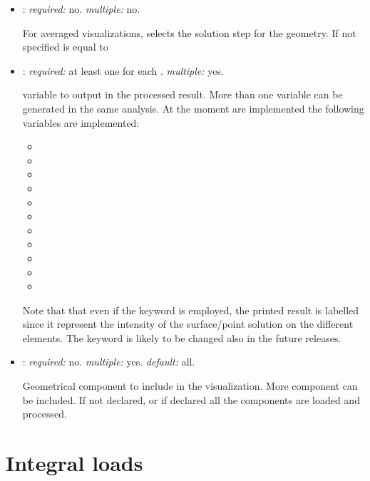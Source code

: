 \begin{itemize}
average the results in the given time span, and output just one averaged result. 
When used in visualizations,  must be False.

\item {}: \textit{required:} no. \textit{multiple:} no.

For averaged visualizations, selects the solution step for the geometry.
If not specified is equal to 

\item {}: \textit{required:} at least one for each . 
\textit{multiple:} yes.

variable to output in the processed result. More than one variable can be generated 
in the same analysis. At the moment are implemented the following variables are implemented: 
\begin{itemize}
  \item {}
  \item {}
  \item {}
  \item {}
  \item {}
  \item {}
  \item {}
  \item {}
  \item {}
  \item {}
  \item {}
\end{itemize} 
Note that that even if the keyword  is employed, the printed result 
is labelled  since it represent the intensity of the 
surface/point solution on the different elements. The keyword is likely to 
be changed also in the future releases.

\item {}: \textit{required:} no. \textit{multiple:} yes. \textit{default:} all.

Geometrical component to include in the visualization. More component can be included. 
If not declared, or if declared  all the components are loaded and processed. 
\end{itemize}

\section{Integral loads}

